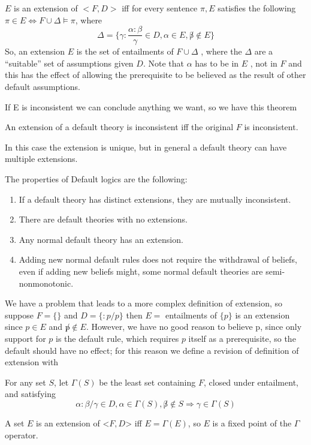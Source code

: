 $E$ is an extension of $<F, D>$ iff for every sentence $\pi, E$ satisfies the 
following $\pi \in E \iff F \cup \Delta \models \pi$, where 
\[ \Delta = \{ \gamma : \frac{\alpha : \beta}{\gamma} \in D, \alpha \in E, 
                        \not \beta \not \in E\} \]
So, an extension $E$ is the set of entailments of $F \cup \Delta$ , where the
$\Delta$ are a “suitable” set of assumptions given $D$.\newline
Note that $\alpha$ has to be in $E$ , not in $F$ and this has the effect of allowing
the prerequisite to be believed as the result of other default assumptions.

If E is inconsistent we can conclude anything we want, so we have this theorem
\begin{thm}
   An extension of a default theory is inconsistent iff the original $F$ is inconsistent.
\end{thm}
In this case the extension is unique, but in general a default theory
can have multiple extensions.

The properties of Default logics are the following:
\begin{enumerate}
    \item If a default theory has distinct extensions, they are mutually inconsistent.
    \item There are default theories with no extensions.
    \item Any normal default theory has an extension.
    \item Adding new normal default rules does not require the withdrawal of beliefs,
          even if adding new beliefs might, some normal default theories 
	  are semi-nonmonotonic.
\end{enumerate}
We have a problem that leads to a more complex definition of extension, so suppose 
$F = \{ \}$ and $D = \{: p / p\}$ then $E = $ entailments of $\{p\}$ is an extension
since $p \in E$ and $\not p \not \in E$.\newline
However, we have no good reason to believe p, since only support for $p$ is the
default rule, which requires $p$ itself as a prerequisite, so the default should
have no effect; for this reason we define a revision of definition of extension with
\begin{defi}
    For any set $S$, let $\Gamma(S)$ be the least set containing $F$, closed under 
    entailment, and satisfying 
    \[ \alpha: \beta / \gamma \in D, \alpha \in \Gamma(S), \not \beta \not \in S 
	\Rightarrow \gamma \in \Gamma(S) \]
\end{defi}
A set $E$ is an extension of <$F, D$> iff $E = \Gamma(E)$, so $E$ is a fixed point
of the $\Gamma$ operator.

